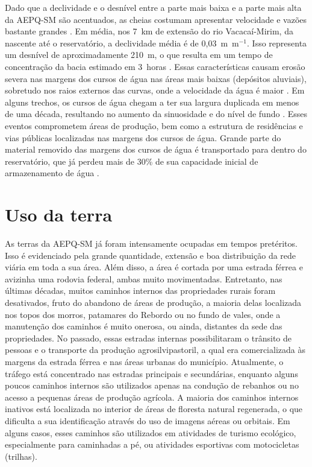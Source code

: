 \documentclass[final]{article}
\begin{document}
Dado que a declividade e o desnível entre a parte mais baixa e a parte mais alta da AEPQ-SM são acentuados, as cheias costumam apresentar velocidade e vazões bastante grandes \cite{PaivaEtAl2001, SutiliEtAl2009}. Em média, nos 7~km de extensão do rio Vacacaí-Mirim, da nascente até o reservatório, a declividade média é de 0,03~m~m$^{-1}$. Isso representa um desnível de aproximadamente 210~m, o que resulta em um tempo de concentração da bacia estimado em 3~horas \cite{PaivaEtAl2001}. Essas características causam erosão severa nas margens dos cursos de água nas áreas mais baixas (depósitos aluviais), sobretudo nos raios externos das curvas, onde a velocidade da água é maior \cite{SutiliEtAl2009}. Em alguns trechos, os cursos de água chegam a ter sua largura duplicada em menos de uma década, resultando no aumento da sinuosidade e do nível de fundo \cite{PaivaEtAl2001}. Esses eventos comprometem áreas de produção, bem como a estrutura de residências e vias públicas localizadas nas margens dos cursos de água. Grande parte do material removido das margens dos cursos de água é transportado para dentro do reservatório, que já perdeu mais de 30\% de sua capacidade inicial de armazenamento de água \cite{DillEtAl2004}.

\section{Uso da terra}

As terras da AEPQ-SM já foram intensamente ocupadas em tempos pretéritos. Isso é evidenciado pela grande quantidade, extensão e boa distribuição da rede viária em toda a sua área. Além disso, a área é cortada por uma estrada férrea e avizinha uma rodovia federal, ambas muito movimentadas. Entretanto, nas últimas décadas, muitos caminhos internos das propriedades rurais foram desativados, fruto do abandono de áreas de produção, a maioria delas localizada nos topos dos morros, patamares do Rebordo ou no fundo de vales, onde a manutenção dos caminhos é muito onerosa, ou ainda, distantes da sede das propriedades. No passado, essas estradas internas possibilitaram o trânsito de pessoas e o transporte da produção agrosilvipastoril, a qual era comercializada às margens da estrada férrea e nas áreas urbanas do município. Atualmente, o tráfego está concentrado nas estradas principais e secundárias, enquanto alguns poucos caminhos internos são utilizados apenas na condução de rebanhos ou no acesso a pequenas áreas de produção agrícola. A maioria dos caminhos internos inativos está localizada no interior de áreas de floresta natural regenerada, o que dificulta a sua identificação através do uso de imagens aéreas ou orbitais. Em alguns casos, esses caminhos são utilizados em atividades de turismo ecológico, especialmente para caminhadas a pé, ou atividades esportivas com motocicletas (trilhas).
\end{document}
